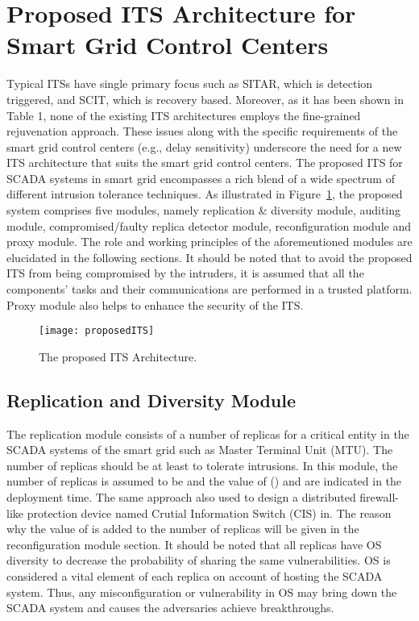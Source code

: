 \documentclass[preprint,number,12pt]{elsarticle}
\begin{document}
\section{Proposed ITS Architecture for Smart Grid Control Centers}
\label{sec: proposed architecture}
Typical ITSs have single primary focus such as SITAR, which is detection triggered, and SCIT, which is recovery based. Moreover, as it has been shown in Table 1, none of the existing ITS architectures employs the fine-grained rejuvenation approach. These issues along with the specific requirements of the smart grid control centers (e.g., delay sensitivity) underscore the need for a new ITS architecture that suits the smart grid control centers. The proposed ITS for SCADA systems in smart grid encompasses a rich blend of a wide spectrum of different intrusion tolerance techniques. As illustrated in Figure~\ref{fig:proposedITS}, the proposed system comprises five modules, namely replication \& diversity module, auditing module, compromised/faulty replica detector module, reconfiguration module and proxy module. The role and working principles of the aforementioned modules are elucidated in the following sections. It should be noted that to avoid the proposed ITS from being compromised by the intruders, it is assumed that all the components' tasks and their communications are performed in a trusted platform. Proxy module also helps to enhance the security of the ITS.
\begin{figure}[!t]
\centering
\texttt{[image: proposedITS]}
\caption{The proposed ITS Architecture.}
\label{fig:proposedITS}
\end{figure}
\subsection{Replication and Diversity Module}
The replication module consists of a number of replicas for a critical entity in the SCADA systems of the smart grid such as Master Terminal Unit (MTU). The number of replicas should be at least  to tolerate  intrusions. In this module, the number of replicas is assumed to be  and the value of  () and  are indicated in the deployment time. The same approach also used to design a distributed firewall-like protection device named Crutial Information Switch (CIS) in\citep{Bessani2008c}. The reason why the value of  is added to the number of replicas will be given in the reconfiguration module section. It should be noted that all replicas have OS diversity to decrease the probability of sharing the same vulnerabilities. OS is considered a vital element of each replica on account of hosting the SCADA system. Thus, any misconfiguration or vulnerability in OS may bring down the SCADA system and causes the adversaries achieve breakthroughs\citep{Nicholson2012418}.
\end{document}

